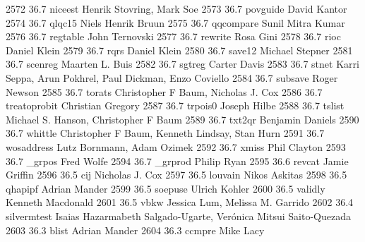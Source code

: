   2572     36.7    niceest       Henrik Stovring, Mark Soe               
  2573     36.7    povguide      David Kantor                            
  2574     36.7    qlqc15        Niels Henrik Bruun                      
  2575     36.7    qqcompare     Sunil Mitra Kumar                       
  2576     36.7    regtable      John Ternovski                          
  2577     36.7    rewrite       Rosa Gini                               
  2578     36.7    rioc          Daniel Klein                            
  2579     36.7    rqrs          Daniel Klein                            
  2580     36.7    save12        Michael Stepner                         
  2581     36.7    scenreg       Maarten L. Buis                         
  2582     36.7    sgtreg        Carter Davis                            
  2583     36.7    stnet         Karri Seppa, Arun Pokhrel, Paul         
                                   Dickman, Enzo Coviello                  
  2584     36.7    subsave       Roger Newson                            
  2585     36.7    torats        Christopher F Baum, Nicholas J. Cox     
  2586     36.7    treatoprobit  Christian Gregory                       
  2587     36.7    trpois0       Joseph Hilbe                            
  2588     36.7    tslist        Michael S. Hanson, Christopher F Baum   
  2589     36.7    txt2qr        Benjamin Daniels                        
  2590     36.7    whittle       Christopher F Baum, Kenneth Lindsay,    
                                   Stan Hurn                               
  2591     36.7    wosaddress    Lutz Bornmann, Adam Ozimek              
  2592     36.7    xmiss         Phil Clayton                            
  2593     36.7    _grpos        Fred Wolfe                              
  2594     36.7    _grprod       Philip Ryan                             
  2595     36.6    revcat        Jamie Griffin                           
  2596     36.5    cij           Nicholas J. Cox                         
  2597     36.5    louvain       Nikos Askitas                           
  2598     36.5    qhapipf       Adrian Mander                           
  2599     36.5    soepuse       Ulrich Kohler                           
  2600     36.5    validly       Kenneth Macdonald                       
  2601     36.5    vbkw          Jessica Lum, Melissa M. Garrido         
  2602     36.4    silvermtest   Isaias Hazarmabeth Salgado-Ugarte,      
                                   Verónica Mitsui Saito-Quezada          
  2603     36.3    blist         Adrian Mander                           
  2604     36.3    ccmpre        Mike Lacy                               
